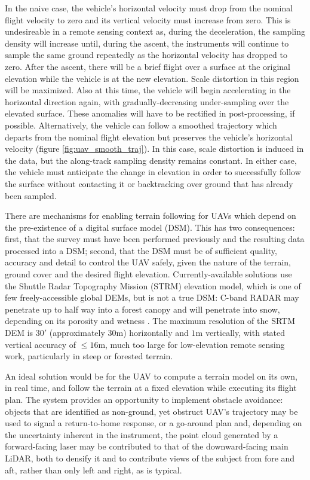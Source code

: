 \documentclass[10pt,a4paper]{report}
\begin{document}
In the naive case, the vehicle's horizontal velocity must drop from the nominal flight velocity to zero and its vertical velocity must increase from zero. This is undesireable in a remote sensing context as, during the deceleration, the sampling density will increase until, during the ascent, the instruments will continue to sample the same ground repeatedly as the horizontal velocity has dropped to zero. After the ascent, there will be a brief flight over a surface at the original elevation while the vehicle is at the new elevation. Scale distortion in this region will be maximized. Also at this time, the vehicle will begin accelerating in the horizontal direction again, with gradually-decreasing under-sampling over the elevated surface. These anomalies will have to be rectified in post-processing, if possible. Alternatively, the vehicle can follow a smoothed trajectory which departs from the nominal flight elevation but preserves the vehicle's horizontal velocity (figure \ref{fig:uav_smooth_traj}). In this case, scale distortion is induced in the data, but the along-track sampling density remains constant. In either case, the vehicle must anticipate the change in elevation in order to successfully follow the surface without contacting it or backtracking over ground that has already been sampled.

There are mechanisms for enabling terrain following for UAVs which depend on the pre-existence of a digital surface model (DSM). This has two consequences: first, that the survey must have been performed previously and the resulting data processed into a DSM; second, that the DSM must be of sufficient quality, accuracy and detail to control the UAV safely, given the nature of the terrain, ground cover and the desired flight elevation. Currently-available solutions use the Shuttle Radar Topography Mission (STRM) elevation model, which is one of few freely-accessible global DEMs, but is not a true DSM: C-band RADAR may penetrate up to half way into a forest canopy \cite{Carabajal2005} and will penetrate into snow, depending on its porosity and wetness \cite{Tighe2009}. The maximum resolution of the SRTM DEM is $30'$ (approximately $30\si{\m}$) horizontally and $1\si{\m}$ vertically, with stated vertical accuracy of $\leq16\si{\m}$, much too large for low-elevation remote sensing work, particularly in steep or forested terrain.

An ideal solution would be for the UAV to compute a terrain model on its own, in real time, and follow the terrain at a fixed elevation while executing its flight plan. The system provides an opportunity to implement obstacle avoidance: objects that are identified as non-ground, yet obstruct UAV’s trajectory may be used to signal a return-to-home response, or a go-around plan and, depending on the uncertainty inherent in the instrument, the point cloud generated by a forward-facing laser may be contributed to that of the downward-facing main LiDAR, both to densify it and to contribute views of the subject from fore and aft, rather than only left and right, as is typical. 
\end{document}
